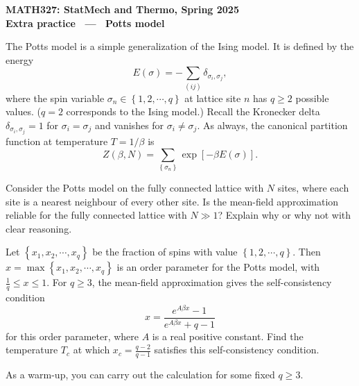 \documentclass[12 pt]{article} %
\newcommand{\be}{\ensuremath{\beta} }
\newcommand{\de}{\ensuremath{\delta} }
\newcommand{\si}{\ensuremath{\sigma} }
\begin{document}
\newcommand{\thisunit}{MATH327 Extra (Potts model)}
\newcommand{\moddate}{Last modified 12 May 2025}
\begin{center}
  {\Large \textbf{MATH327: StatMech and Thermo, Spring 2025}} \\[12 pt]
  {\Large \textbf{Extra practice \ --- \ Potts model}} \\[24 pt]
\end{center}

The Potts model is a simple generalization of the Ising model.
It is defined by the energy
\begin{equation*}
  E(\si) = -\sum_{(ij)} \de_{\si_i, \si_j},
\end{equation*}
where the spin variable $\si_n \in \left\{1, 2, \cdots, q\right\}$ at lattice site $n$ has $q \geq 2$ possible values.
($q = 2$ corresponds to the Ising model.)
Recall the Kronecker delta $\de_{\si_i, \si_j} = 1$ for $\si_i = \si_j$ and vanishes for $\si_i \ne \si_j$.
As always, the canonical partition function at temperature $T = 1 / \be$ is
\begin{equation*}
  Z(\be, N) = \sum_{\left\{\si_n\right\}} \exp\left[-\be E(\si)\right].
\end{equation*}

Consider the Potts model on the fully connected lattice with $N$ sites, where each site is a nearest neighbour of every other site.
Is the mean-field approximation reliable for the fully connected lattice with $N \gg 1$?  Explain why or why not with clear reasoning.

Let $\left\{x_1, x_2, \cdots, x_q\right\}$ be the fraction of spins with value $\left\{1, 2, \cdots, q\right\}$.
Then $x = \max\left\{x_1, x_2, \cdots, x_q\right\}$ is an order parameter for the Potts model, with $\frac{1}{q} \leq x \leq 1$.
For $q \geq 3$, the mean-field approximation gives the self-consistency condition %
\begin{equation*}
  x = \frac{e^{A\be x} - 1}{e^{A\be x} + q - 1}
\end{equation*}
for this order parameter, where $A$ is a real positive constant.
Find the temperature $T_c$ at which $x_c = \frac{q - 2}{q - 1}$ satisfies this self-consistency condition.

As a warm-up, you can carry out the calculation for some fixed $q \geq 3$.
\end{document}
